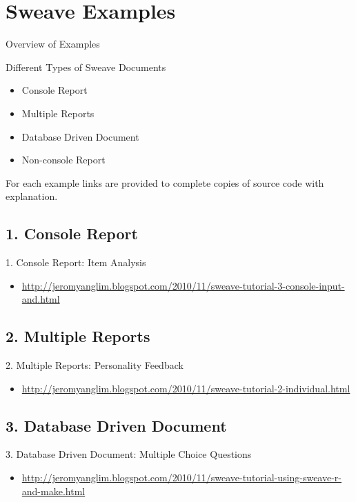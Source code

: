 \section{Sweave Examples}
\begin{frame}{Overview of Examples}
\begin{block}{Different Types of Sweave Documents}
\begin{itemize}
  \item Console Report
  \item Multiple Reports
  \item Database Driven Document
  \item Non-console Report   
\end{itemize}
\end{block}

For each example links are provided to complete copies of source code with explanation.
\end{frame}

\subsection{1. Console Report}
\begin{frame}{1. Console Report: Item Analysis}
\begin{itemize}
\item {\tiny
\url{http://jeromyanglim.blogspot.com/2010/11/sweave-tutorial-3-console-input-and.html}}
\end{itemize}
\end{frame}


\subsection{2. Multiple Reports}
\begin{frame}{2. Multiple Reports: Personality Feedback}
\begin{itemize}
\item {\tiny\url{http://jeromyanglim.blogspot.com/2010/11/sweave-tutorial-2-individual.html}}
\end{itemize}
\end{frame}

\subsection{3. Database Driven Document}
\begin{frame}{3. Database Driven Document: Multiple Choice Questions}
\begin{itemize}
\item {\tiny
\url{http://jeromyanglim.blogspot.com/2010/11/sweave-tutorial-using-sweave-r-and-make.html}}
\end{itemize}
\end{frame}



